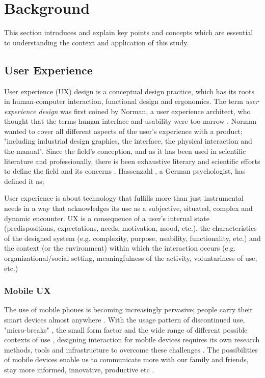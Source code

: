 \chapter{Background}
\label{chap:background}
This section introduces and explain key points and concepts which are essential to understanding the context and application of this study.

\section{User Experience}
User experience (UX) design is a conceptual design practice, which has its roots in human-computer interaction, functional design and ergonomics. The term \textit{user experience design} was first coined by Norman, a user experience architect, who thought that the terms human interface and usability were too narrow \cite{Merholz2007}. Norman wanted to cover all different aspects of the user's experience with a product; "including industrial design graphics, the interface, the physical interaction and the manual". Since the field's conception, and as it has been used in scientific literature and professionally, there is been exhaustive literary and scientific efforts to define the field and its concerns \cite{Law2008} \cite{Law2009} \cite{Forlizzi2000}. Hassenzahl \cite{Hassenzahl2006}, a German psychologist, has defined it as;
\begin{displayquote}
  User experience is about technology that fulfills more than just instrumental needs in a way that acknowledges its use as a subjective, situated, complex and dynamic encounter. UX is a consequence of a user's internal state (predispositions, expectations, needs, motivation, mood, etc.), the characteristics of the designed system (e.g. complexity, purpose, usability, functionality, etc.) and the context (or the environment) within which the interaction occurs (e.g. organizational/social setting, meaningfulness of the activity, voluntariness of use, etc.)
\end{displayquote}

\subsection{Mobile UX}
The use of mobile phones is becoming increasingly pervasive; people carry their smart devices almost anywhere \cite{Mallat2004}. With the usage pattern of discontinued use, "micro-breaks" \cite{McGregor2014a}, the small form factor and the wide range of different possible contexts of use \cite{Wang2016}, designing interaction for mobile devices requires its own research methods, tools and infrastructure to overcome these challenges \cite{Nakhimovsky2009}. The possibilities of mobile devices enable us to communicate more with our family and friends, stay more informed, innovative, productive etc \cite{Wang2016}.

